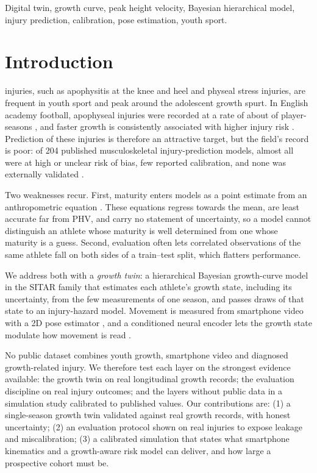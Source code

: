 \documentclass[journal]{IEEEtran}
\begin{document}
\begin{IEEEkeywords}
Digital twin, growth curve, peak height velocity, Bayesian hierarchical model, injury
prediction, calibration, pose estimation, youth sport.
\end{IEEEkeywords}

\section{Introduction}
 injuries, such as apophysitis at the knee and heel and
physeal stress injuries, are frequent in youth sport and peak around the adolescent growth
spurt. In English academy football, apophyseal injuries were recorded at a rate of about
\SpecIncidence{} of player-seasons \cite{oxendale2025}, and faster growth is consistently
associated with higher injury risk \cite{hall2025}. Prediction of these injuries is therefore an
attractive target, but the field's record is poor: of 204 published musculoskeletal
injury-prediction models, almost all were at high or unclear risk of bias, few reported
calibration, and none was externally validated \cite{bullock2022}.

Two weaknesses recur. First, maturity enters models as a point estimate from an anthropometric
equation \cite{mirwald2002,moore2015}. These equations regress towards the mean, are least
accurate far from PHV, and carry no statement of uncertainty, so a model cannot distinguish an
athlete whose maturity is well determined from one whose maturity is a guess. Second,
evaluation often lets correlated observations of the same athlete fall on both sides of a
train--test split, which flatters performance.

We address both with a \emph{growth twin}: a hierarchical Bayesian growth-curve model in the
SITAR family \cite{cole2010sitar} that estimates each athlete's growth state, including its
uncertainty, from the few measurements of one season, and passes draws of that state to an
injury-hazard model. Movement is measured from smartphone video with a 2D pose estimator
\cite{bazarevsky2020blazepose}, and a conditioned neural encoder lets the growth state modulate
how movement is read \cite{perez2018film}.

No public dataset combines youth growth, smartphone video and diagnosed growth-related injury.
We therefore test each layer on the strongest evidence available: the growth twin on real
longitudinal growth records; the evaluation discipline on real injury outcomes; and the layers
without public data in a simulation study calibrated to published values. Our contributions
are: (1) a single-season growth twin validated against real growth records, with honest
uncertainty; (2) an evaluation protocol shown on real injuries to expose leakage and
miscalibration; (3) a calibrated simulation that states what smartphone kinematics and a
growth-aware risk model can deliver, and how large a prospective cohort must be.
\end{document}
